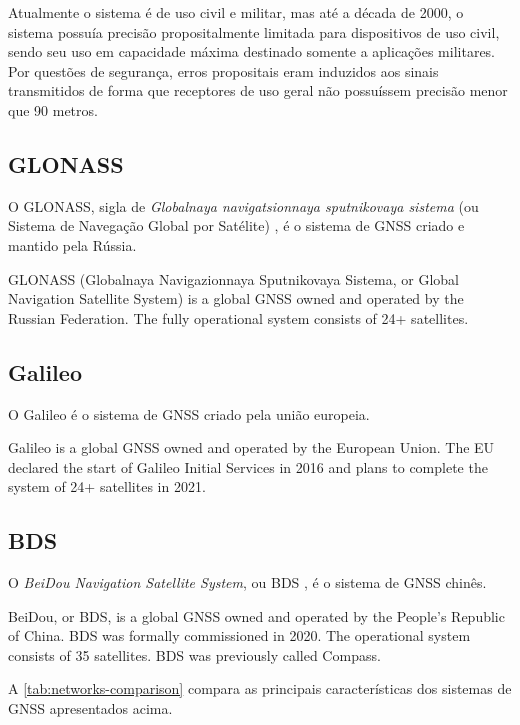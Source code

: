 Atualmente o sistema é de uso civil e militar, mas até a década de 2000, o sistema possuía precisão propositalmente limitada para dispositivos de uso civil, sendo seu uso em capacidade máxima destinado somente a aplicações militares. Por questões de segurança, erros propositais eram induzidos aos sinais transmitidos de forma que receptores de uso geral não possuíssem precisão menor que 90 metros.


\subsection{GLONASS}

O GLONASS, sigla de \textit{Globalnaya navigatsionnaya sputnikovaya sistema} (ou Sistema de Navegação Global por Satélite) \cite{glonass}, é o sistema de GNSS criado e mantido pela Rússia.

GLONASS (Globalnaya Navigazionnaya Sputnikovaya Sistema, or Global Navigation Satellite System) is a global GNSS owned and operated by the Russian Federation. The fully operational system consists of 24+ satellites.

\subsection{Galileo}

O Galileo é o sistema de GNSS criado pela união europeia.

Galileo is a global GNSS owned and operated by the European Union. The EU declared the start of Galileo Initial Services in 2016 and plans to complete the system of 24+ satellites in 2021.

\subsection{BDS}

O \textit{BeiDou Navigation Satellite System}, ou BDS \cite{beidou}, é o sistema de GNSS chinês.

BeiDou, or BDS, is a global GNSS owned and operated by the People's Republic of China. BDS was formally commissioned in 2020. The operational system consists of 35 satellites. BDS was previously called Compass.



A \autoref{tab:networks-comparison} compara as principais características dos sistemas de GNSS apresentados acima.

